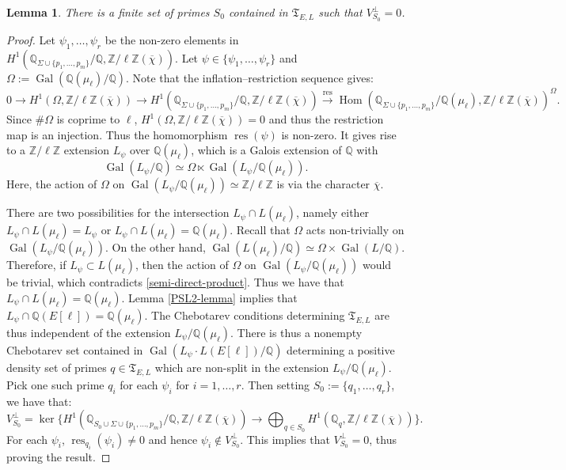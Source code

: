 \documentclass[11pt,reqno]{amsart}
\newtheorem{lemma}[theorem]{Lemma}
\newcommand{\Z}{\mathbb{Z}}
\newcommand{\Q}{\mathbb{Q}}
\newcommand{\op}[1]{\operatorname{#1}}
\numberwithin{equation}{section}
\begin{document}
\begin{lemma}\label{choice of S_0}
    There is a finite set of primes $S_0$ contained in $\mathfrak{T}_{E,L}$ such that $V_{S_0}^\perp=0$.
\end{lemma}
\begin{proof}
Let $\psi_1, \dots, \psi_r$ be the non-zero elements in $H^1(\Q_{\Sigma\cup \{p_1, \dots, p_m\}}/\Q, \Z/\ell \Z(\overline{\chi}))$. Let $\psi\in \{\psi_1, \dots, \psi_r\}$ and $\Omega:=\op{Gal}(\Q(\mu_\ell)/\Q)$. Note that the inflation--restriction sequence gives:
{\small
\[ 0\rightarrow H^1\left(\Omega,\Z/\ell \Z(\overline{\chi})\right)\rightarrow H^1(\Q_{\Sigma\cup \{p_1, \dots, p_m\}}/\Q, \Z/\ell \Z(\overline{\chi}))\xrightarrow{\op{res}} \op{Hom}(\Q_{\Sigma\cup \{p_1, \dots, p_m\}}/\Q(\mu_\ell), \Z/\ell \Z(\overline{\chi}))^{\Omega}.\]}
Since $\# \Omega$ is coprime to $\ell$, $H^1\left(\Omega,\Z/\ell \Z(\overline{\chi})\right)=0$ and thus the restriction map is an injection. Thus the homomorphism $\op{res}(\psi)$ is non-zero. It gives rise to a $\Z/\ell \Z$ extension $L_\psi$ over $\Q(\mu_\ell)$, which is a Galois extension of $\Q$ with 
\begin{equation}\label{semi-direct-product}
\op{Gal}(L_{\psi}/\Q)\simeq \Omega \ltimes \op{Gal}(L_{\psi}/\Q(\mu_\ell)).
\end{equation}
Here, the action of $\Omega$ on $\op{Gal}(L_{\psi}/\Q(\mu_\ell))\simeq \Z/\ell\Z$ is via the character $\overline{\chi}$. 
\par There are two possibilities for the intersection $L_{\psi}\cap L(\mu_\ell)$, namely either $L_{\psi}\cap L(\mu_\ell)=L_{\psi}$ or $L_\psi\cap L(\mu_\ell)=\Q(\mu_\ell)$. Recall that $\Omega$ acts non-trivially on $\op{Gal}(L_\psi/\Q(\mu_\ell))$. On the other hand, $\op{Gal}(L(\mu_\ell)/\Q)\simeq \Omega\times \op{Gal}(L/\Q)$. Therefore, if $L_\psi\subset L(\mu_\ell)$, then the action of $\Omega$ on $\op{Gal}(L_\psi/\Q(\mu_\ell))$ would be trivial, which contradicts \eqref{semi-direct-product}. Thus we have that $L_{\psi}\cap L(\mu_\ell)=\Q(\mu_\ell)$. Lemma \ref{PSL2-lemma} implies that $L_{\psi}\cap \Q(E[\ell])=\Q(\mu_\ell)$. The Chebotarev conditions determining $\mathfrak{T}_{E,L}$ are thus independent of the extension $L_\psi/\Q(\mu_\ell)$. There is thus a nonempty Chebotarev set contained in $\op{Gal}(L_\psi \cdot L(E[\ell])/\Q)$ determining a positive density set of primes $q\in \mathfrak{T}_{E,L}$ which are non-split in the extension $L_\psi/\Q(\mu_\ell)$. Pick one such prime $q_i$ for each $\psi_i$ for $i=1, \dots, r$. Then setting $S_0:=\{q_1, \dots, q_r\}$, we have that:
\[V_{S_0}^\perp=\op{ker}\{H^1(\Q_{S_0\cup \Sigma\cup \{p_1, \dots,p_m\}} /\Q, \Z/\ell\Z(\overline{\chi}))\longrightarrow \bigoplus_{q\in S_0} H^1(\Q_q, \Z/\ell\Z(\overline{\chi}))\}.\]
For each $\psi_i$, $\op{res}_{q_i}(\psi_i)\neq 0$ and hence $\psi_i\notin V_{S_0}^\perp$. This implies that $V_{S_0}^\perp=0$, thus proving the result. 
\end{proof}
\end{document}
